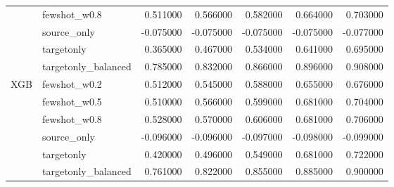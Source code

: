 \begin{tabular}{llrrrrr}
 & fewshot_w0.8 & 0.511000 & 0.566000 & 0.582000 & 0.664000 & 0.703000 \\
 & source_only & -0.075000 & -0.075000 & -0.075000 & -0.075000 & -0.077000 \\
 & targetonly & 0.365000 & 0.467000 & 0.534000 & 0.641000 & 0.695000 \\
 & targetonly_balanced & 0.785000 & 0.832000 & 0.866000 & 0.896000 & 0.908000 \\
\cline{1-7}
\multirow[t]{6}{*}{XGB} & fewshot_w0.2 & 0.512000 & 0.545000 & 0.588000 & 0.655000 & 0.676000 \\
 & fewshot_w0.5 & 0.510000 & 0.566000 & 0.599000 & 0.681000 & 0.704000 \\
 & fewshot_w0.8 & 0.528000 & 0.570000 & 0.606000 & 0.681000 & 0.706000 \\
 & source_only & -0.096000 & -0.096000 & -0.097000 & -0.098000 & -0.099000 \\
 & targetonly & 0.420000 & 0.496000 & 0.549000 & 0.681000 & 0.722000 \\
 & targetonly_balanced & 0.761000 & 0.822000 & 0.855000 & 0.885000 & 0.900000 \\
\cline{1-7}
\bottomrule
\end{tabular}
